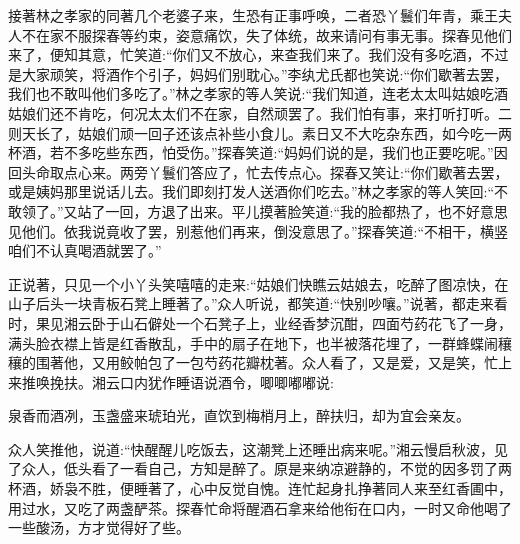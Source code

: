 \begin{parag}
    接著林之孝家的同著几个老婆子来，生恐有正事呼唤，二者恐丫鬟们年青，乘王夫人不在家不服探春等约束，姿意痛饮，失了体统，故来请问有事无事。探春见他们来了，便知其意，忙笑道:“你们又不放心，来查我们来了。我们没有多吃酒，不过是大家顽笑，将酒作个引子，妈妈们别耽心。”李纨尤氏都也笑说:“你们歇著去罢，我们也不敢叫他们多吃了。”林之孝家的等人笑说:“我们知道，连老太太叫姑娘吃酒姑娘们还不肯吃，何况太太们不在家，自然顽罢了。我们怕有事，来打听打听。二则天长了，姑娘们顽一回子还该点补些小食儿。素日又不大吃杂东西，如今吃一两杯酒，若不多吃些东西，怕受伤。”探春笑道:“妈妈们说的是，我们也正要吃呢。”因回头命取点心来。两旁丫鬟们答应了，忙去传点心。探春又笑让:“你们歇著去罢，或是姨妈那里说话儿去。我们即刻打发人送酒你们吃去。”林之孝家的等人笑回:“不敢领了。”又站了一回，方退了出来。平儿摸著脸笑道:“我的脸都热了，也不好意思见他们。依我说竟收了罢，别惹他们再来，倒没意思了。”探春笑道:“不相干，横竖咱们不认真喝酒就罢了。”
\end{parag}


\begin{parag}
    正说著，只见一个小丫头笑嘻嘻的走来:“姑娘们快瞧云姑娘去，吃醉了图凉快，在山子后头一块青板石凳上睡著了。”众人听说，都笑道:“快别吵嚷。”说著，都走来看时，果见湘云卧于山石僻处一个石凳子上，业经香梦沉酣，四面芍药花飞了一身，满头脸衣襟上皆是红香散乱，手中的扇子在地下，也半被落花埋了，一群蜂蝶闹穰穰的围著他，又用鲛帕包了一包芍药花瓣枕著。众人看了，又是爱，又是笑，忙上来推唤挽扶。湘云口内犹作睡语说酒令，唧唧嘟嘟说:
\end{parag}


\begin{poem}
    \begin{pl}泉香而酒冽，玉盏盛来琥珀光，直饮到梅梢月上，醉扶归，却为宜会亲友。\end{pl}
\end{poem}


\begin{parag}
    众人笑推他，说道:“快醒醒儿吃饭去，这潮凳上还睡出病来呢。”湘云慢启秋波，见了众人，低头看了一看自己，方知是醉了。原是来纳凉避静的，不觉的因多罚了两杯酒，娇袅不胜，便睡著了，心中反觉自愧。连忙起身扎挣著同人来至红香圃中，用过水，又吃了两盏酽茶。探春忙命将醒酒石拿来给他衔在口内，一时又命他喝了一些酸汤，方才觉得好了些。
\end{parag}


